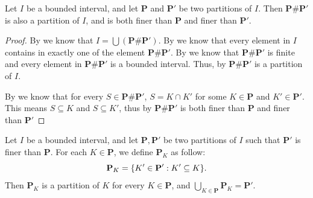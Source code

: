 \setcounter{thm}{17}
\begin{lem}\label{i:11.1.18}
  Let \(I\) be a bounded interval, and let \(\mathbf{P}\) and \(\mathbf{P}'\) be two partitions of \(I\).
  Then \(\mathbf{P} \# \mathbf{P}'\) is also a partition of \(I\), and is both finer than \(\mathbf{P}\) and finer than \(\mathbf{P}'\).
\end{lem}

\begin{proof}
  By  we know that \(I = \bigcup (\mathbf{P} \# \mathbf{P}')\).
  By  we know that every element in \(I\) contains in exactly one of the element \(\mathbf{P} \# \mathbf{P}'\).
  By  we know that \(\mathbf{P} \# \mathbf{P}'\) is finite and every element in  \(\mathbf{P} \# \mathbf{P}'\) is a bounded interval.
  Thus, by  \(\mathbf{P} \# \mathbf{P}'\) is a partition of \(I\).

  By  we know that for every \(S \in \mathbf{P} \# \mathbf{P}'\), \(S = K \cap K'\) for some \(K \in \mathbf{P}\) and \(K' \in \mathbf{P}'\).
  This means \(S \subseteq K\) and \(S \subseteq K'\), thus by  \(\mathbf{P} \# \mathbf{P}'\) is both finer than \(\mathbf{P}\) and finer than \(\mathbf{P}'\)
\end{proof}

\begin{ac}\label{i:ac:11.1.4}
  Let \(I\) be a bounded interval, and let \(\mathbf{P}, \mathbf{P}'\) be two partitions of \(I\) such that \(\mathbf{P}'\) is finer than \(\mathbf{P}\).
  For each \(K \in \mathbf{P}\), we define \(\mathbf{P}_K\) as follow:
  \[
    \mathbf{P}_K = \set{K' \in \mathbf{P}' : K' \subseteq K}.
  \]
  Then \(\mathbf{P}_K\) is a partition of \(K\) for every \(K \in \mathbf{P}\), and \(\bigcup_{K \in \mathbf{P}} \mathbf{P}_K = \mathbf{P}'\).
\end{ac}

